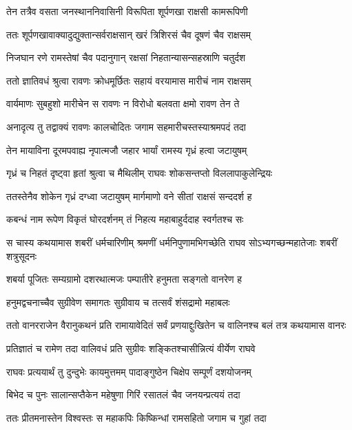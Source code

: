 \twolineshloka
{तेन तत्रैव वसता जनस्थाननिवासिनी}
{विरूपिता शूर्पणखा राक्षसी कामरूपिणी} %

\twolineshloka
{ततः शूर्पणखावाक्यादुद्युक्तान्सर्वराक्षसान्}
{खरं त्रिशिरसं चैव दूषणं चैव राक्षसम्} %

\twolineshloka
{निजघान रणे रामस्तेषां चैव पदानुगान्}
{रक्षसां निहतान्यासन्सहस्राणि चतुर्दश} %

\twolineshloka
{ततो ज्ञातिवधं श्रुत्वा रावणः क्रोधमूर्छितः}
{सहायं वरयामास मारीचं नाम राक्षसम्} %

\twolineshloka
{वार्यमाणः सुबहुशो मारीचेन स रावणः}
{न विरोधो बलवता क्षमो रावण तेन ते} %

\twolineshloka
{अनादृत्य तु तद्वाक्यं रावणः कालचोदितः}
{जगाम सहमारीचस्तस्याश्रमपदं तदा} %

\twolineshloka
{तेन मायाविना दूरमपवाह्य नृपात्मजौ}
{जहार भार्यां रामस्य गृध्रं हत्वा जटायुषम्} %

\twolineshloka
{गृध्रं च निहतं दृष्ट्वा हृतां श्रुत्वा च मैथिलीम्}
{राघवः शोकसन्तप्तो विललापाकुलेन्द्रियः} %

\twolineshloka
{ततस्तेनैव शोकेन गृध्रं दग्ध्वा जटायुषम्}
{मार्गमाणो वने सीतां राक्षसं सन्ददर्श ह} %

\twolineshloka
{कबन्धं नाम रूपेण विकृतं घोरदर्शनम्}
{तं निहत्य महाबाहुर्ददाह स्वर्गतश्च सः} %

\threelineshloka
{स चास्य कथयामास शबरीं धर्मचारिणीम्}
{श्रमणीं धर्मनिपुणामभिगच्छेति राघव}
{सोऽभ्यगच्छन्महातेजाः शबरीं शत्रुसूदनः} %

\twolineshloka
{शबर्या पूजितः सम्यग्रामो दशरथात्मजः}
{पम्पातीरे हनुमता सङ्गतो वानरेण ह} %

\twolineshloka
{हनुमद्वचनाच्चैव सुग्रीवेण समागतः}
{सुग्रीवाय च तत्सर्वं शंसद्रामो महाबलः} %

\threelineshloka
{ततो वानरराजेन वैरानुकथनं प्रति}
{रामायावेदितं सर्वं प्रणयाद्दुःखितेन च}
{वालिनश्च बलं तत्र कथयामास वानरः} %

\twolineshloka
{प्रतिज्ञातं च रामेण तदा वालिवधं प्रति}
{सुग्रीवः शङ्कितश्चासीन्नित्यं वीर्येण राघवे} %

\twolineshloka
{राघवः प्रत्ययार्थं तु दुन्दुभेः कायमुत्तमम्}
{पादाङ्गुष्ठेन चिक्षेप सम्पूर्णं दशयोजनम्} %

\twolineshloka
{बिभेद च पुनः सालान्सप्तैकेन महेषुणा}
{गिरिं रसातलं चैव जनयन्प्रत्ययं तदा} %

\twolineshloka
{ततः प्रीतमनास्तेन विश्वस्तः स महाकपिः}
{किष्किन्धां रामसहितो जगाम च गुहां तदा} %

